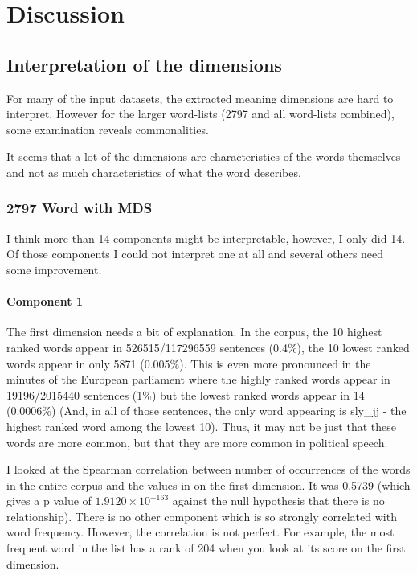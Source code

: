 \documentclass[eric_thesis.tex]{subfiles}
\begin{document}
\chapter{Discussion}

\section{Interpretation of the dimensions}

For many of the input datasets, the extracted meaning dimensions are hard to 
interpret. However for the larger word-lists (2797 and all word-lists 
combined), some examination reveals commonalities. 


It seems that a lot of the dimensions are characteristics of the words 
themselves and not as much characteristics of what the word describes.

\subsection{2797 Word with MDS}

I think more than 14 components might be interpretable, however, I only did 14. 
Of those components I could not interpret one at all and several others need 
some improvement. 

\subsubsection{Component 1}

The first dimension needs a bit of explanation. In the corpus, the 10 highest 
ranked words appear in 526515/117296559 sentences (0.4\%), the 10 lowest 
ranked words appear in only 5871 (0.005\%). This is even more pronounced in the 
minutes of the European parliament where the highly ranked words appear in 
19196/2015440 sentences (1\%) but the lowest ranked words appear in 14 
(0.0006\%) (And, in all of those sentences, the only word appearing is 
sly\_jj - the highest ranked word among the lowest 10). Thus, it may not be 
just that these words are more common, but that they are more common in 
political speech.

I looked at the Spearman correlation between number of occurrences of the words 
in the entire corpus and the values in on the first dimension. It was 0.5739 
(which gives a p value of $1.9120 \times 10^{-163}$ against the null hypothesis 
that there is no relationship). There is no other component which is so 
strongly correlated with word frequency. However, the correlation is not 
perfect. For example, the most frequent word in the list has a rank of 204 when 
you look at its score on the first dimension.
\end{document}
